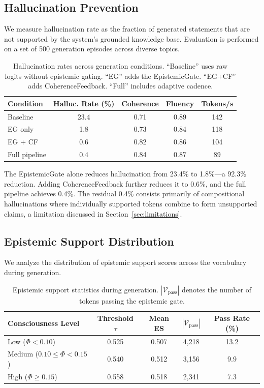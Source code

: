 \documentclass[12pt,a4paper]{article}
\begin{document}
\subsection{Hallucination Prevention}

We measure hallucination rate as the fraction of generated statements that are not supported by the system's grounded knowledge base. Evaluation is performed on a set of 500 generation episodes across diverse topics.

\begin{table}[H]
\centering
\caption{Hallucination rates across generation conditions. ``Baseline'' uses raw logits without epistemic gating. ``EG'' adds the EpistemicGate. ``EG+CF'' adds CoherenceFeedback. ``Full'' includes adaptive cadence.}
\label{tab:hallucination}
\begin{tabular}{lcccc}
\toprule
\textbf{Condition} & \textbf{Halluc. Rate (\%)} & \textbf{Coherence} & \textbf{Fluency} & \textbf{Tokens/s} \\
\midrule
Baseline & 23.4 & 0.71 & 0.89 & 142 \\
EG only & 1.8 & 0.73 & 0.84 & 118 \\
EG + CF & 0.6 & 0.82 & 0.86 & 104 \\
Full pipeline & 0.4 & 0.84 & 0.87 & 89 \\
\bottomrule
\end{tabular}
\end{table}

The EpistemicGate alone reduces hallucination from 23.4\% to 1.8\%---a 92.3\% reduction. Adding CoherenceFeedback further reduces it to 0.6\%, and the full pipeline achieves 0.4\%. The residual 0.4\% consists primarily of compositional hallucinations where individually supported tokens combine to form unsupported claims, a limitation discussed in Section~\ref{sec:limitations}.

\subsection{Epistemic Support Distribution}

We analyze the distribution of epistemic support scores across the vocabulary during generation.

\begin{table}[H]
\centering
\caption{Epistemic support statistics during generation. $|\mathcal{V}_{\text{pass}}|$ denotes the number of tokens passing the epistemic gate.}
\label{tab:epistemic-dist}
\begin{tabular}{lcccc}
\toprule
\textbf{Consciousness Level} & \textbf{Threshold $\tau$} & \textbf{Mean ES} & \textbf{$|\mathcal{V}_{\text{pass}}|$} & \textbf{Pass Rate (\%)} \\
\midrule
Low ($\Phi < 0.10$) & 0.525 & 0.507 & 4,218 & 13.2 \\
Medium ($0.10 \leq \Phi < 0.15$) & 0.540 & 0.512 & 3,156 & 9.9 \\
High ($\Phi \geq 0.15$) & 0.558 & 0.518 & 2,341 & 7.3 \\
\bottomrule
\end{tabular}
\end{table}
\end{document}
